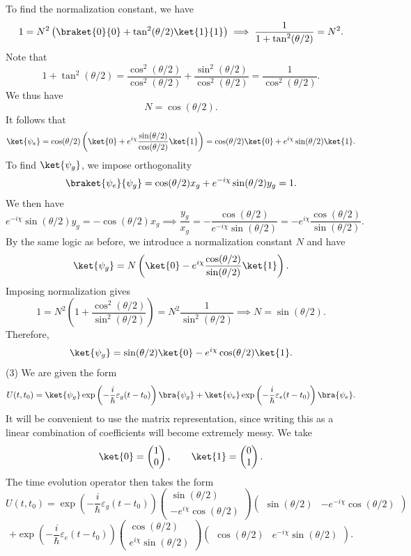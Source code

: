 \documentclass[11pt, letterpaper]{article}
\begin{document}
To find the normalization constant, we have
\[
	1=N^2\left( \braket{0}{0}+\tan ^2(\theta /2)\ket{1}{1} \right) \implies \frac{1}{1+\tan ^2(\theta /2)} =N^2
.\]
Note that
\[
	1+\tan ^2(\theta /2)=\frac{\cos  ^2(\theta /2)}{\cos ^2(\theta /2)} +\frac{\sin ^2(\theta /2)}{\cos ^2(\theta /2)} =\frac{1}{\cos ^2(\theta /2)} 
.\]
We thus have
\[
	N=\cos (\theta /2)
.\]
It follows that
\[
	\ket{\psi _e}=\cos (\theta /2)\left( \ket{0}+e^{i\chi }\frac{\sin (\theta /2)}{\cos (\theta /2)} \ket{1} \right) =\cos (\theta /2)\ket{0}+e^{i\chi } \sin (\theta /2)\ket{1}
.\]
To find $\ket{\psi _g}$, we impose orthogonality
\[
	\braket{\psi _e}{\psi _g}=\cos (\theta /2)x_g+e^{-i\chi } \sin (\theta /2)y_g=1
.\]
We then have
\[
	e^{-i\chi } \sin (\theta /2)y_g=-\cos (\theta /2)x_g\implies \frac{y_g}{x_g} =-\frac{\cos (\theta /2)}{e^{-i\chi } \sin (\theta /2)} =-e^{i\chi } \frac{\cos (\theta /2)}{\sin (\theta /2)} 
.\]
By the same logic as before, we introduce a normalization constant $N$ and have
\[
	\ket{\psi _g}=N\left( \ket{0}-e^{i\chi } \frac{\cos (\theta /2)}{\sin (\theta /2)} \ket{1} \right) 
.\]
Imposing normalization gives
\[
	1=N^2\left( 1+\frac{\cos ^2(\theta /2)}{\sin ^2(\theta /2)}  \right) =N^2\frac{1}{\sin ^2(\theta /2)} \implies N=\sin (\theta /2)
.\]
Therefore,
\[
	\ket{\psi _g}=\sin (\theta /2)\ket{0}-e^{i\chi } \cos (\theta /2)\ket{1}
.\]
(3) We are given the form
\[
	U(t,t_0)=\ket{\psi _g}\exp \left( -\frac{i}{\hbar} \varepsilon _g(t-t_0) \right) \bra{\psi _g}+\ket{\psi _e}\exp \left( -\frac{i}{\hbar} \varepsilon _e(t-t_0) \right) \bra{\psi _e}
.\]
It will be convenient to use the matrix representation, since writing this as a linear combination of coefficients will become extremely messy. We take
\[
	\ket{0}=\begin{pmatrix}
	1 \\
	0
\end{pmatrix},\qquad \ket{1}=\begin{pmatrix}
0 \\
1
\end{pmatrix}
.\]
The time evolution operator then takes the form
\[
	U(t,t_0)=\exp \left( -\frac{i}{\hbar} \varepsilon _g(t-t_0) \right) \begin{pmatrix}
	\sin (\theta /2) \\
	-e^{i\chi } \cos (\theta /2)
	\end{pmatrix}\begin{pmatrix}
	\sin (\theta /2) & -e^{-i\chi } \cos (\theta /2)
	\end{pmatrix}
\]
\[
	+\exp \left( -\frac{i}{\hbar} \varepsilon _e(t-t_0) \right) \begin{pmatrix}
	\cos (\theta /2) \\
	e^{i\chi } \sin (\theta /2)
	\end{pmatrix}\begin{pmatrix}
	\cos (\theta /2) & e^{-i\chi } \sin (\theta /2)
	\end{pmatrix}
.\]
\end{document}
